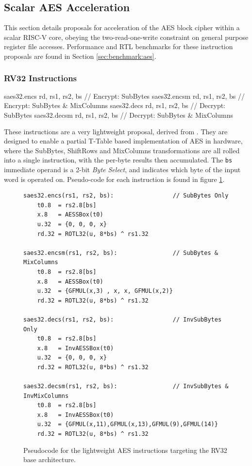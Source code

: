 
\newpage
\subsection{Scalar AES Acceleration}
\label{sec:scalar:aes}

This section details proposals for acceleration of
the AES block cipher \cite{nist:fips:197} within a scalar RISC-V core,
obeying the two-read-one-write constraint on general purpose register
file accesses.
Performance and RTL benchmarks for these
instruction proposals are found in Section
\ref{sec:benchmark:aes}.

\subsubsection{RV32 Instructions}
\label{sec:scalar:aes:rv32}

\begin{cryptoisa}
saes32.encs      rd, rs1, rs2, bs // Encrypt: SubBytes
saes32.encsm     rd, rs1, rs2, bs // Encrypt: SubBytes & MixColumns
saes32.decs      rd, rs1, rs2, bs // Decrypt: SubBytes
saes32.decsm     rd, rs1, rs2, bs // Decrypt: SubBytes & MixColumns
\end{cryptoisa}

These instructions are a very lightweight proposal, derived from
\cite{MJS:20}.
They are designed to enable a partial T-Table based implementation
of AES in hardware, where the SubBytes, ShiftRows and MixColumns
transformations are all rolled into a single instruction, with the
per-byte results then accumulated.
The {\tt bs} immediate operand is a 2-bit {\em Byte Select}, and indicates
which byte of the input word is operated on.
Pseudo-code for each instruction is found in figure
\ref{fig:pseudo:aes:rv32}.

\begin{figure}[h]
\begin{lstlisting}[language=pseudo]
saes32.encs(rs1, rs2, bs):                 // SubBytes Only
    t0.8  = rs2.8[bs]
    x.8   = AESSBox(t0)
    u.32  = {0, 0, 0, x}
    rd.32 = ROTL32(u, 8*bs) ^ rs1.32

saes32.encsm(rs1, rs2, bs):                // SubBytes & MixColumns
    t0.8  = rs2.8[bs]
    x.8   = AESSBox(t0)
    u.32  = {GFMUL(x,3) , x, x, GFMUL(x,2)}
    rd.32 = ROTL32(u, 8*bs) ^ rs1.32

saes32.decs(rs1, rs2, bs):                 // InvSubBytes Only
    t0.8  = rs2.8[bs]
    x.8   = InvAESSBox(t0)
    u.32  = {0, 0, 0, x}
    rd.32 = ROTL32(u, 8*bs) ^ rs1.32

saes32.decsm(rs1, rs2, bs):                // InvSubBytes & InvMixColumns
    t0.8  = rs2.8[bs]
    x.8   = InvAESSBox(t0)
    u.32  = {GFMUL(x,11),GFMUL(x,13),GFMUL(9),GFMUL(14)}
    rd.32 = ROTL32(u, 8*bs) ^ rs1.32
\end{lstlisting}
\caption{Pseudocode for the lightweight AES instructions targeting the
RV32 base architecture.}
\label{fig:pseudo:aes:rv32}
\end{figure}

